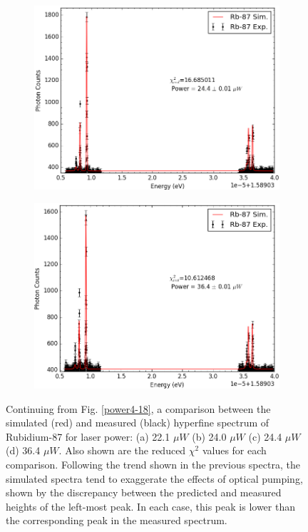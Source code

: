 \begin{figure}[t!]
    \begin{subfigure}[b]{0.49\textwidth}
        \includegraphics[width=\textwidth]{Graphics/121_122.png}
        \caption{}
    \end{subfigure}
    \begin{subfigure}[b]{0.49\textwidth}
        \includegraphics[width=\textwidth]{Graphics/111_112.png}
        \caption{}
        \label{}
    \end{subfigure}
    \caption[Continuation of Fig. \ref{power4-18}.]{\small Continuing from Fig. \ref{power4-18}, a comparison between the simulated (red) and measured (black) hyperfine spectrum of Rubidium-87 for laser power: (a) 22.1 $\mu W$ (b) 24.0 $\mu W$ (c) 24.4 $\mu W$ (d) 36.4 $\mu W$. Also shown are the reduced $\chi^2$ values for each comparison. Following the trend shown in the previous spectra, the simulated spectra tend to exaggerate the effects of optical pumping, shown by the discrepancy between the predicted and measured heights of the left-most peak. In each case, this peak is lower than the corresponding peak in the measured spectrum. }
\label{power22-36}
\end{figure}
